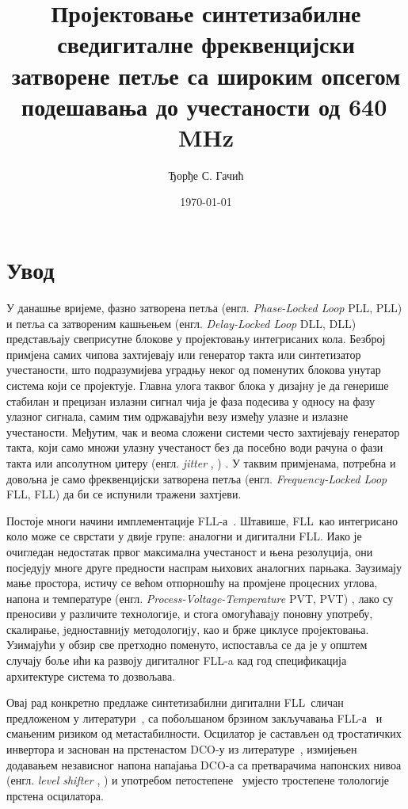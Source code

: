 \documentclass[master]{finthesis}
\title{Пројектовање синтетизабилне сведигиталне фреквенцијски затворене петље са широким опсегом подешавања до учестаности од 640\texorpdfstring{\,}{ }MHz}
\author{Ђорђе С. Гачић}
\date{\today}
\makeatletter
\newcommand*{\engl}[2][\@empty]{%
    \edef\theacronym{#1}%
    (енгл. \foreignlanguage{english}{\emph{#2}%
    \ifx\theacronym\@empty \else , #1\fi})%
}
\def \FLL  {FLL} %
\def \DCO  {DCO} %
\makeatother
\begin{document}
\maketitle

\tableofcontents

\makeabstract

\section{Увод}
У данашње вријеме, фазно затворена петља \engl[PLL]{Phase-Locked Loop} и петља са затвореним кашњењем \engl[DLL]{Delay-Locked Loop} представљају свеприсутне блокове у пројектовању интегрисаних кола. Безброј примјена самих чипова захтијевају или генератор такта или синтетизатор учестаности, што подразумијева уградњу неког од поменутих блокова унутар система који се пројектује. Главна улога таквог блока у дизајну је да генерише стабилан и прецизан излазни сигнал чија је фаза подесива у односу на фазу улазног сигнала, самим тим одржавајући везу између улазне и излазне учестаности. Међутим, чак и веома сложени системи често захтијевају генератор такта, који само множи улазну учестаност без да посебно води рачуна о фази такта или апсолутном џитеру \engl{jitter}. У таквим примјенама, потребна и довољна је само фреквенцијски затворена петља \engl[FLL]{Frequency-Locked Loop} да би се испунили тражени захтјеви. \par
Постоје многи начини имплементације \FLL-а~\cite{Ali:9097205}. Штавише, \FLL\ као интегрисано коло може се сврстати у двије групе: аналогни и дигитални \FLL. Иако је очигледан недостатак првог максимална учестаност и њена резолуција, они посједују многе друге предности наспрам њихових аналогних парњака. Заузимају мање простора, истичу се већом отпорношћу на промјене процесних углова, напона и температуре \engl[PVT]{Process-Voltage-Temperature}, лако су преносиви у различите технологиjе, и стога омогућаваjу поновну употребу, скалирање, jедноставниjу методологиjу, као и брже циклусе проjектовања. Узимајући у обзир све претходно поменуто, испоставља се да је у општем случају боље ићи ка развоју дигиталног \FLL-a кад год спецификација архитектуре система то дозвољава. \par
Овај рад конкретно предлаже синтетизабилни дигитални \FLL\ сличан предложеном у литератури~\cite{Musa:6644316}, са побољшаном брзином закључавања \FLL-а~\cite{Deng:6891375} и смањеним ризиком од метастабилности. Осцилатор је састављен од тростатичких инвертора и заснован на прстенастом \DCO-у из литературе~\cite{Tierno:4443210}, измијењен додавањем независног напона напајања \DCO-а са претварачима напонских нивоа \engl{level shifter} и употребом петостепене~\cite{Rylyakov:4523284} умјесто тростепене толологије прстена осцилатора. \par
\end{document}

